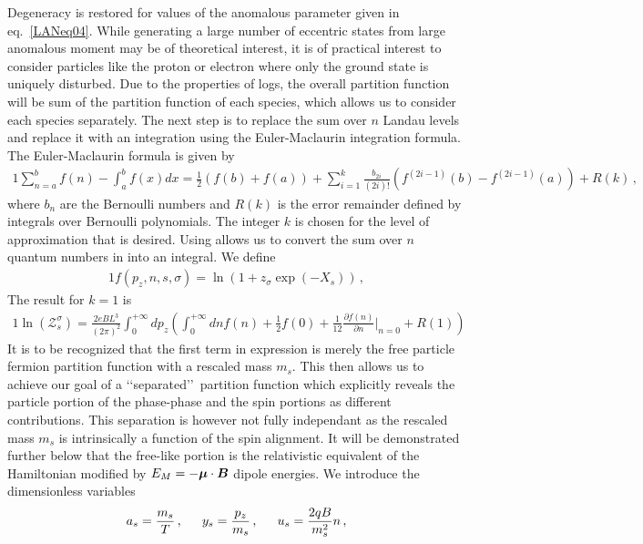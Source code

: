 Degeneracy is restored for values of the anomalous parameter given in eq.~\eqref{LANeq04}. While generating a large number of eccentric states from large anomalous moment may be of theoretical interest, it is of practical interest to consider particles like the proton or electron where only the ground state is uniquely disturbed. Due to the properties of logs, the overall partition function will be sum of the partition function of each species, which allows us to consider each species separately. The next step is to replace the sum over $n$ Landau levels and replace it with an integration using the Euler-Maclaurin integration formula. The Euler-Maclaurin formula is given by
\begin{alignat}{1}
    \label{EulerM} \sum^{b}_{n=a}f(n)-\int^{b}_{a}f(x)dx = \frac{1}{2}\left(f(b)+f(a)\right)+\sum_{i=1}^{k}\frac{b_{2i}}{(2i)!}\left(f^{(2i-1)}(b)-f^{(2i-1)}(a)\right)+R(k)\,,
\end{alignat}
where $b_{n}$ are the Bernoulli numbers and $R(k)$ is the error remainder defined by integrals over Bernoulli polynomials. The integer $k$ is chosen for the level of approximation that is desired. Using  allows us to convert the sum over $n$ quantum numbers in  into an integral. We define
\begin{alignat}{1}
    \label{Func} f(p_{z},n,s,\sigma)=\ln\left(1+z_{\sigma}\exp(-X_{s})\right)\,,
\end{alignat}
The result for $k=1$ is
\begin{alignat}{1}
    \label{PartFuncTwo} \ln\left(\mathcal{Z}_{s}^{\sigma}\right)=\frac{2eBL^{3}}{(2\pi)^{2}}\int_{0}^{+\infty}dp_{z}\left(\int_{0}^{+\infty}dn f(n) + \frac{1}{2}f(0) + \frac{1}{12}\frac{\partial f(n)}{\partial n}\bigg\rvert_{n=0} + R(1)\right)
\end{alignat}
It is to be recognized that the first term in expression  is merely the free particle fermion partition function with a rescaled mass $m_{s}$. This then allows us to achieve our goal of a \lq\lq separated\rq\rq\ partition function which explicitly reveals the particle portion of the phase-phase and the spin portions as different contributions. This separation is however not fully independant as the rescaled mass $m_{s}$ is intrinsically a function of the spin alignment. It will be demonstrated further below that the free-like portion is the relativistic equivalent of the Hamiltonian modified by $E_{M}=-\boldsymbol{\mu}\cdot\boldsymbol{B}$ dipole energies. We introduce the dimensionless variables
\begin{alignat}{1}
    \label{Unitless} a_{s}=\frac{m_{s}}{T}\,,\indent y_{s}=\frac{p_{z}}{m_{s}}\,,\indent u_{s}=\frac{2qB}{m_{s}^{2}}n\,,
\end{alignat}
